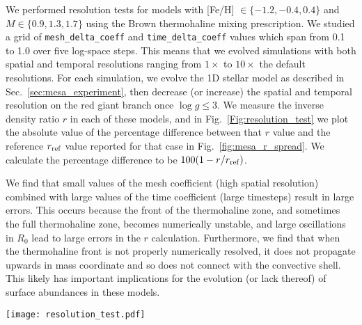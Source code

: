 We performed resolution tests for models with [Fe/H] $\in \{-1.2, -0.4, 0.4\}$ and $M \in \{0.9, 1.3, 1.7\}$ using the Brown thermohaline mixing prescription.
We studied a grid of \texttt{mesh\_delta\_coeff} and \texttt{time\_delta\_coeff} values which span from 0.1 to 1.0 over five log-space steps.
This means that we evolved simulations with both spatial and temporal resolutions ranging from $1\times$ to $10\times$ the default resolutions.
For each simulation, we evolve the 1D stellar model as described in Sec.~\ref{sec:mesa_experiment}, then decrease (or increase) the spatial and temporal resolution on the red giant branch once $\log g \leq 3$.
We measure the inverse density ratio $r$ in each of these models, and in Fig.~\ref{Fig:resolution_test} we plot the absolute value of the percentage difference between that $r$ value and the reference $r_{\rm ref}$ value reported for that case in Fig.~\ref{fig:mesa_r_spread}.
We calculate the percentage difference to be $100(1 - r/r_{\rm{ref}})$.

We find that small values of the mesh coefficient (high spatial resolution) combined with large values of the time coefficient (large timesteps) result in large errors.
This occurs because the front of the thermohaline zone, and sometimes the full thermohaline zone, becomes numerically unstable, and large oscillations in $R_0$ lead to large errors in the $r$ calculation.
Furthermore, we find that when the thermohaline front is not properly numerically resolved, it does not propagate upwards in mass coordinate and so does not connect with the convective shell.
This likely has important implications for the evolution (or lack thereof) of surface abundances in these models.


\begin{figure*}[!tb]
\begin{center}
\texttt{[image: resolution\_test.pdf]}
\caption{
    We plot a 3x3 grid of colormaps corresponding to a grid of mass $M \in [0.9, 1.3, 1.7]$ and [Fe/H]$ \in [-1.2, -0.4, 0.4]$.
    At each mass and [Fe/H], we simulate a 5x5 grid of MESA models with varying spatial and temporal resolution.
    We plot in color the percent difference between the measured value of the reduced density ratio $r$ and its reference value reported in Fig.~\ref{fig:mesa_r_spread}.
    The resolution of the grids of simulations presented in Fig.~\ref{fig:mesa_r_spread} are marked by black stars.
    Cases with $r$ measurements within 5\% of the reference values are colored in green, while points with larger differences are colored pink.
    }
\label{Fig:resolution_test}
\end{center}
\end{figure*}